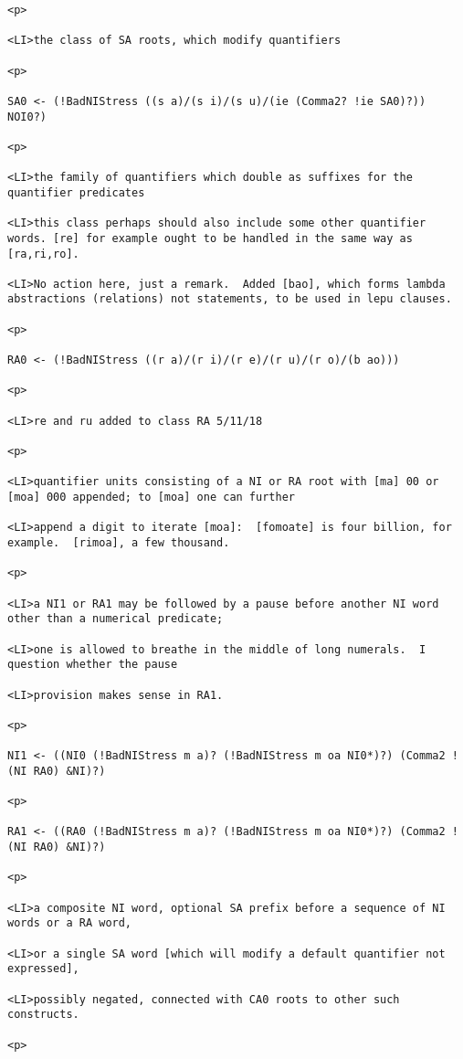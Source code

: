 \documentclass[12pt]{article}
\begin{document}
\begin{lstlisting}
<p>

<LI>the class of SA roots, which modify quantifiers

<p>

SA0 <- (!BadNIStress ((s a)/(s i)/(s u)/(ie (Comma2? !ie SA0)?)) NOI0?)

<p>

<LI>the family of quantifiers which double as suffixes for the quantifier predicates

<LI>this class perhaps should also include some other quantifier words. [re] for example ought to be handled in the same way as [ra,ri,ro].

<LI>No action here, just a remark.  Added [bao], which forms lambda abstractions (relations) not statements, to be used in lepu clauses.

<p>

RA0 <- (!BadNIStress ((r a)/(r i)/(r e)/(r u)/(r o)/(b ao)))

<p>

<LI>re and ru added to class RA 5/11/18

<p>

<LI>quantifier units consisting of a NI or RA root with [ma] 00 or [moa] 000 appended; to [moa] one can further

<LI>append a digit to iterate [moa]:  [fomoate] is four billion, for example.  [rimoa], a few thousand.

<p>

<LI>a NI1 or RA1 may be followed by a pause before another NI word other than a numerical predicate;

<LI>one is allowed to breathe in the middle of long numerals.  I question whether the pause

<LI>provision makes sense in RA1.

<p>

NI1 <- ((NI0 (!BadNIStress m a)? (!BadNIStress m oa NI0*)?) (Comma2 !(NI RA0) &NI)?)

<p>

RA1 <- ((RA0 (!BadNIStress m a)? (!BadNIStress m oa NI0*)?) (Comma2 !(NI RA0) &NI)?)

<p>

<LI>a composite NI word, optional SA prefix before a sequence of NI words or a RA word,

<LI>or a single SA word [which will modify a default quantifier not expressed],

<LI>possibly negated, connected with CA0 roots to other such constructs.

<p>


\end{lstlisting}
\end{document}
